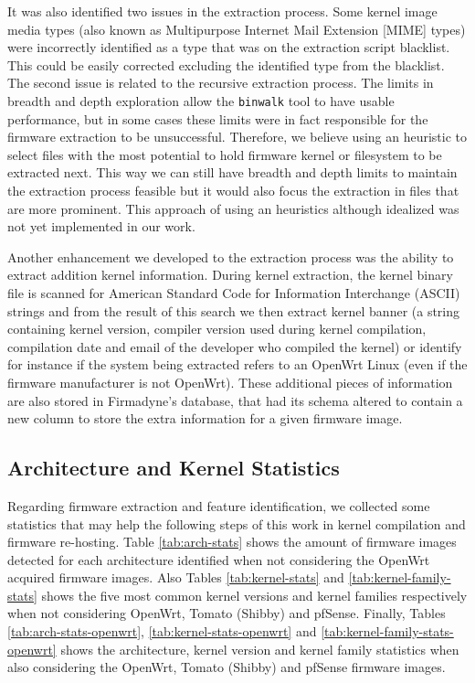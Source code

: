 It was also identified two issues in the extraction process. Some kernel image media types (also known as Multipurpose Internet Mail Extension [MIME] types) were incorrectly identified as a type that was on the extraction script blacklist. This could be easily corrected excluding the identified type from the blacklist. The second issue is related to the recursive extraction process. The limits in breadth and depth exploration allow the {\tt binwalk} tool to have usable performance, but in some cases these limits were in fact responsible for the firmware extraction to be unsuccessful. Therefore, we believe using an heuristic to select files with the most potential to hold firmware kernel or filesystem to be extracted next. This way we can still have breadth and depth limits to maintain the extraction process feasible but it would also focus the extraction in files that are more prominent. This approach of using an heuristics although idealized was not yet implemented in our work.

Another enhancement we developed to the extraction process was the ability to extract addition kernel information. During kernel extraction, the kernel binary file is scanned for American Standard Code for Information Interchange (ASCII) strings and from the result of this search we then extract kernel banner (a string containing kernel version, compiler version used during kernel compilation, compilation date and email of the developer who compiled the kernel) or identify for instance if the system being extracted refers to an OpenWrt Linux (even if the firmware manufacturer is not OpenWrt). These additional pieces of information are also stored in Firmadyne's \cite{firmadyne} database, that had its schema altered to contain a new column to store the extra information for a given firmware image.


\subsection{Architecture and Kernel Statistics}

Regarding firmware extraction and feature identification, we collected some statistics that may help the following steps of this work in kernel compilation and firmware re-hosting. Table \ref{tab:arch-stats} shows the amount of firmware images detected for each architecture identified when not considering the OpenWrt acquired firmware images. Also Tables \ref{tab:kernel-stats} and \ref{tab:kernel-family-stats} shows the five most common kernel versions and kernel families respectively when not considering OpenWrt, Tomato (Shibby) and pfSense. Finally, Tables \ref{tab:arch-stats-openwrt}, \ref{tab:kernel-stats-openwrt} and \ref{tab:kernel-family-stats-openwrt} shows the architecture, kernel version and kernel family statistics when also considering the OpenWrt, Tomato (Shibby) and pfSense firmware images.

